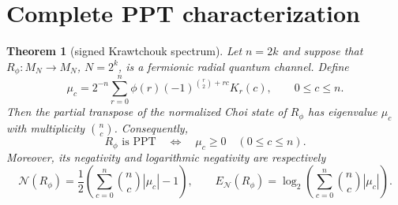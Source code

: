 \documentclass[11pt]{article}
\newtheorem{theorem}{Theorem}
\begin{document}
\section{Complete PPT characterization}

\begin{theorem}[signed Krawtchouk spectrum]\label{thm:main}
Let $n=2k$ and suppose that $R_\phi:M_N\to M_N$, $N=2^k$, is a fermionic
radial quantum channel.  Define
\begin{equation}\label{eq:mu}
 \mu_c=2^{-n}\sum_{r=0}^n
 \phi(r)(-1)^{\binom r2+rc}K_r(c),
 \qquad 0\le c\le n.
\end{equation}
Then the partial transpose of the normalized Choi state of $R_\phi$ has
eigenvalue $\mu_c$ with multiplicity $\binom nc$.  Consequently,
\[
 R_\phi\text{ is PPT}
 \quad\Longleftrightarrow\quad
 \mu_c\ge0\quad(0\le c\le n).
\]
Moreover, its negativity and logarithmic negativity are respectively
\[
 \mathcal N(R_\phi)=\frac12\left(
 \sum_{c=0}^n\binom nc|\mu_c|-1\right),
 \qquad
 E_{\mathcal N}(R_\phi)=
 \log_2\left(\sum_{c=0}^n\binom nc|\mu_c|\right).
\]
\end{theorem}
\end{document}
